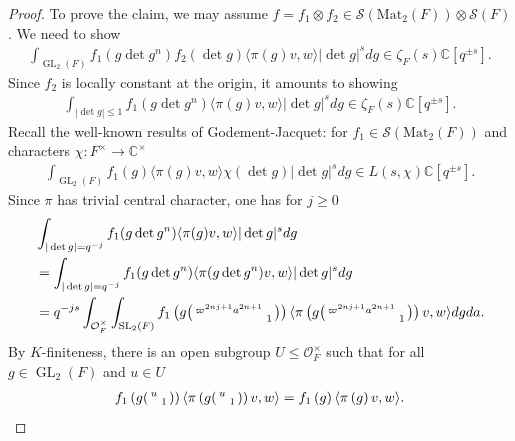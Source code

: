 \documentclass[10pt]{amsart}
\theoremstyle{definition}
\numberwithin{equation}{section}
\DeclareMathOperator{\GL}{\mathrm{GL}}
\DeclareMathOperator{\SL}{\mathrm{SL}}
\numberwithin{equation}{subsection}
\newcommand{\CC}{\mathbb{C}}
\newenvironment{psmatrix}
  {\left(\begin{smallmatrix}}
  {\end{smallmatrix}\right)}
\begin{document}
\begin{proof}
To prove the claim, we may assume $f=f_1\otimes f_2\in \mathcal{S}(\mathrm{Mat}_2(F))\otimes \mathcal{S}(F)$. We need to show
\begin{align*}
    \int_{\GL_2(F)} f_1(g\det g^{n})f_2(\det g)\langle\pi(g)v ,w\rangle |\det g|^s dg\in \zeta_F(s)\CC[q^{\pm s}].
\end{align*}
Since $f_2$ is locally constant at the origin, it amounts to showing
\begin{align}\label{eq:GL2goal}
    \int_{|\det g|\le 1} f_1(g\det g^{n})\langle\pi(g)v ,w\rangle |\det g|^s dg\in \zeta_F(s)\CC[q^{\pm s}].
\end{align}
Recall the well-known results of Godement-Jacquet: for $f_1\in \mathcal{S}(\mathrm{Mat}_2(F))$ and characters $\chi:F^\times \to \CC^\times$
\begin{align}\label{eq:GJ}
    \int_{\GL_{2}(F)} f_1(g)\langle\pi(g)v,w\rangle \chi(\det g)|\det g|^s dg\in L(s,\chi)\CC[q^{\pm s}].
\end{align}
Since $\pi$ has trivial central character, one has for $j\ge 0$ 
\begin{align*}
     &\int_{|\det g|=q^{-j}} f_1(g\det g^{n})\langle\pi(g)v ,w\rangle |\det g|^s dg\\
     &=\int_{|\det g|=q^{-j}} f_1(g\det g^{n})\langle\pi(g\det g^n)v ,w\rangle |\det g|^s dg\\
     &=q^{-js}\int_{\mathcal{O}_F^\times}\int_{\SL_2(F)} f_1\left(g\begin{psmatrix}
         \varpi^{2nj+1}a^{2n+1}&\\
         & 1
     \end{psmatrix}\right)\langle\pi\left(g\begin{psmatrix}
         \varpi^{2nj+1}a^{2n+1}&\\
         & 1
     \end{psmatrix}\right)v ,w\rangle dgda.
\end{align*}
By $K$-finiteness, there is an open subgroup $U\le \mathcal{O}_F^\times$ such that for all $g\in \GL_2(F)$ and $u\in U$
\begin{align*}
    f_1\left(g\begin{psmatrix}
        u&\\
         & 1
     \end{psmatrix}\right)\langle\pi\left(g\begin{psmatrix}
         u&\\
         & 1\end{psmatrix}\right)v ,w\rangle =f_1\left(g\right)\langle\pi\left(g\right)v ,w\rangle.
\end{align*}
 

\end{proof}
\end{document}
